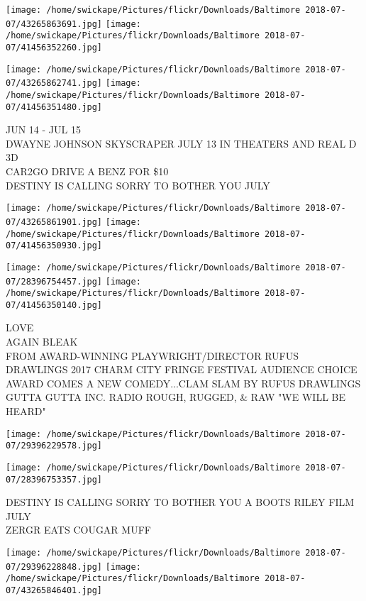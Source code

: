 \documentclass[10pt,letterpaper]{article}
\begin{document}
\texttt{[image: /home/swickape/Pictures/flickr/Downloads/Baltimore 2018-07-07/43265863691.jpg]}
\texttt{[image: /home/swickape/Pictures/flickr/Downloads/Baltimore 2018-07-07/41456352260.jpg]}

\texttt{[image: /home/swickape/Pictures/flickr/Downloads/Baltimore 2018-07-07/43265862741.jpg]}
\texttt{[image: /home/swickape/Pictures/flickr/Downloads/Baltimore 2018-07-07/41456351480.jpg]}

JUN 14 {-} JUL 15\\
DWAYNE JOHNSON SKYSCRAPER JULY 13 IN THEATERS AND REAL D 3D\\
CAR2GO DRIVE A BENZ FOR \$10\\
DESTINY IS CALLING SORRY TO BOTHER YOU JULY\\
\pagebreak

\texttt{[image: /home/swickape/Pictures/flickr/Downloads/Baltimore 2018-07-07/43265861901.jpg]}
\texttt{[image: /home/swickape/Pictures/flickr/Downloads/Baltimore 2018-07-07/41456350930.jpg]}

\texttt{[image: /home/swickape/Pictures/flickr/Downloads/Baltimore 2018-07-07/28396754457.jpg]}
\texttt{[image: /home/swickape/Pictures/flickr/Downloads/Baltimore 2018-07-07/41456350140.jpg]}

LOVE\\
AGAIN BLEAK\\
FROM AWARD{-}WINNING PLAYWRIGHT/DIRECTOR RUFUS DRAWLINGS 2017 CHARM CITY FRINGE FESTIVAL AUDIENCE CHOICE AWARD COMES A NEW COMEDY...CLAM SLAM BY RUFUS DRAWLINGS\\
GUTTA GUTTA INC. RADIO ROUGH, RUGGED, \& RAW "WE WILL BE HEARD"\\
\pagebreak

\texttt{[image: /home/swickape/Pictures/flickr/Downloads/Baltimore 2018-07-07/29396229578.jpg]}

\vspace{0.25in}
\texttt{[image: /home/swickape/Pictures/flickr/Downloads/Baltimore 2018-07-07/28396753357.jpg]}

DESTINY IS CALLING SORRY TO BOTHER YOU A BOOTS RILEY FILM JULY\\
ZERGR EATS COUGAR MUFF\\
\pagebreak

\texttt{[image: /home/swickape/Pictures/flickr/Downloads/Baltimore 2018-07-07/29396228848.jpg]}
\texttt{[image: /home/swickape/Pictures/flickr/Downloads/Baltimore 2018-07-07/43265846401.jpg]}
\end{document}
